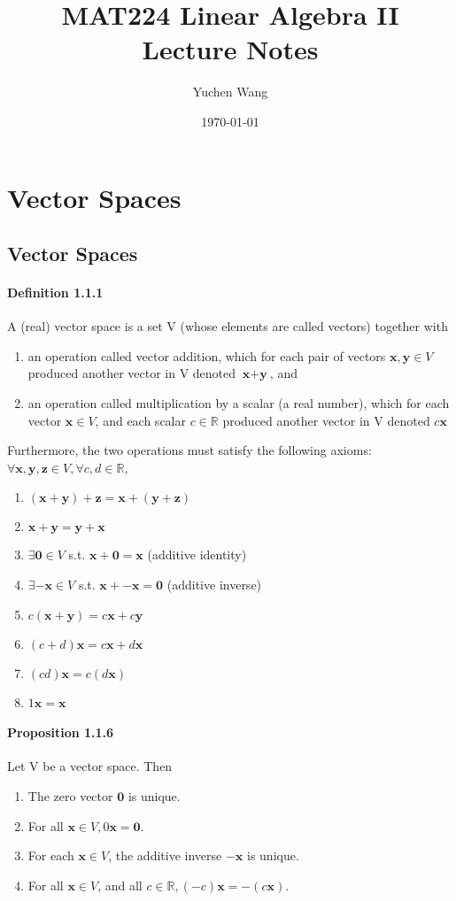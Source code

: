 \documentclass[11pt]{article}
\title{MAT224 Linear Algebra II \\ Lecture Notes}
\author{Yuchen Wang}
\date{\today}
\newcommand{\tb}[1]{\textbf{#1}}
\newcommand{\real}[0]{\mathbb{R}}
\newcommand{\vx}[0]{\tb{x}}
\newcommand{\vy}[0]{\tb{y}}
\newcommand{\vz}[0]{\tb{z}}
\newcommand{\vo}[0]{\tb{0}}
\begin{document}
	\maketitle
	\tableofcontents
	\newpage
	\section{Vector Spaces}
	\subsection{Vector Spaces}
	\paragraph{Definition 1.1.1} A (real) vector space is a set V (whose elements are called vectors) together with
	\begin{enumerate}
		\item an operation called vector addition, which for each pair of vectors $\vx, \vy \in V$ produced another vector in V denoted $\vx + \vy$, and
		\item an operation called multiplication by a scalar (a real number), which for each vector $\vx \in V$, and each scalar $c \in \real$ produced another vector in V denoted $c\vx$
	\end{enumerate}
	Furthermore, the two operations must satisfy the following axioms:
	$\forall \vx, \vy, \vz \in V, \forall c, d \in \real$,
	\begin{enumerate}
		\item $(\vx + \vy) + \vz = \vx + (\vy + \vz)$
		\item $\vx + \vy = \vy + \vx$
		\item $\exists \vo \in V$ s.t. $\vx + \vo = \vx$ (additive identity)
		\item $\exists -\vx \in V$ s.t. $\vx + -\vx = \vo$ (additive inverse)
		\item $c(\vx + \vy) = c\vx + c\vy$
		\item $(c + d)\vx = c\vx + d\vx$
		\item $(cd)\vx = c(d\vx)$
		\item $1\vx = \vx$
	\end{enumerate}
	\paragraph{Proposition 1.1.6}
	Let V be a vector space. Then
	\begin{enumerate}
		\item The zero vector $\vo$ is unique.
		\item For all $\vx \in V, 0\vx = \vo$.
		\item For each $\vx \in V$, the additive inverse $-\vx$ is unique.
		\item For all $\vx \in V$, and all $c \in \real, (-c)\vx = -(c\vx)$.
	\end{enumerate}
\end{document}
